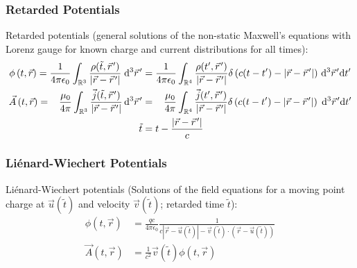 		\subsubsection{Retarded Potentials}
			\label{Sec:RetardedPotentials}
			\noindent
			Retarded potentials (general solutions of the non-static Maxwell's equations with Lorenz gauge for known charge and current distributions for all times):
			\begin{equation}
				\begin{aligned}
					\phi\left(t,\vec{r}\right)
					= \frac{1}{4\pi\epsilon_0} \int_{\mathbb{R}^3} \frac{\rho(\tilde{t},\pvec{r}')}{\left|\vec{r}-\pvec{r}'\right|}\;\diff^3 \pvec{r}'
					&=	\frac{1}{4\pi\epsilon_0} \int_{\mathbb{R}^4} \frac{\rho(t',\pvec{r}')}{\left|\vec{r}-\pvec{r}'\right|}\delta\left( c(t-t')-\left|\vec{r}-\pvec{r}'\right|\right)\,\diff^3 \pvec{r}'\diff t' \\
					\vec{A}\left(t,\vec{r}\right)
					= \phantom{\epsilon_0} \frac{\mu_0}{4\pi} \int_{\mathbb{R}^3} \frac{\vec{j}(\tilde{t},\pvec{r}')}{\left|\vec{r}-\pvec{r}'\right|}\,\diff^3 \pvec{r}'
					&=	\phantom{\epsilon_0} \frac{\mu_0}{4\pi} \int_{\mathbb{R}^4} \frac{\vec{j}(t',\pvec{r}')}{\left|\vec{r}-\pvec{r}'\right|}\delta\left( c(t-t')-\left|\vec{r}-\pvec{r}'\right|\right)\;\diff^3 \pvec{r}'\diff t' \\
					\tilde{t}&=t-\frac{\left|\vec{r}-\pvec{r}'\right|}{c}
				\end{aligned}
			\end{equation}

		\subsubsection{Liénard-Wiechert Potentials}
			\noindent
			Liénard-Wiechert potentials (Solutions of the field equations for a moving point charge at $\vec{u}(\tilde{t})$ and velocity $\vec{v}(\tilde{t})$; retarded time $\tilde{t}$):
			\begin{equation}
				\begin{aligned}
					\phi(t,\vec{r}) & =\frac{q c}{4\pi \epsilon_0}\frac{1}{c \left|\vec{r}-\vec{u}(\tilde{t})\right|-\vec{v}(\tilde{t})\cdot\left(\vec{r}-\vec{u}(\tilde{t})\right)} \\
					\vec{A}(t,\vec{r}) &= \frac{1}{c^2}\vec{v}(\tilde{t})\phi(t,\vec{r}) \\
				\end{aligned}
			\end{equation}

